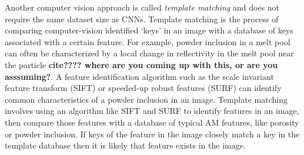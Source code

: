Another computer vision approach is called \textit{template matching} and does not require the same dataset size as CNNs. Template matching is the process of comparing computer-vision identified `keys' in an image with a database of keys associated with a certain feature. For example, powder inclusion in a melt pool can often be characterized by a local change in reflectivity in the melt pool near the particle \textbf{cite???? where are you coming up with this, or are you asssuming?}. A feature identification algorithm such as the scale invariant feature transform (SIFT) \cite{Lowe2004} or speeded-up robust features (SURF) \cite{Bay2008} can identify common characteristics of a powder inclusion in an image. Template matching involves using an algorithm like SIFT and SURF to identify features in an image, then compare those features with a database of typical AM features, like porosity or powder inclusion. If keys of the feature in the image closely match a key in the template database then it is likely that feature exists in the image. 

